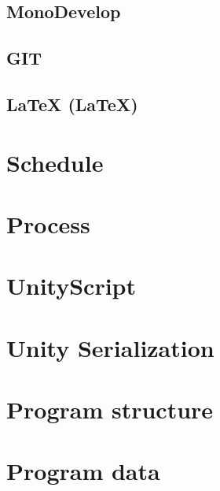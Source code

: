 \documentclass[BSP,english,oneside]{classes/gucthesis}
\begin{document}
		\section{MonoDevelop}
			\label{chap:monodevelop}
			

		\section{GIT}
			\label{chap:git}
			

		\section{LaTeX (\LaTeX{})}
			\label{chap:latex}
			


	\chapter{Schedule}
		\label{chap:schedule}
		

	\chapter{Process}
		\label{chap:process}
		

	\chapter{UnityScript}
		\label{chap:UnityScript}
		

	\chapter{Unity Serialization}
		\label{chap:UnitySerialization}
		

	\chapter{Program structure}
		\label{chap:program_structure}
		

	\chapter{Program data}
		\label{chap:program_data}
		
\end{document}
